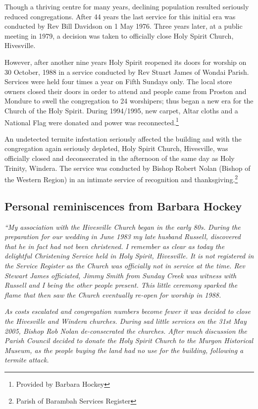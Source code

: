 Though a thriving centre for many years, declining population resulted seriously reduced congregations. After 44 years the last service for this initial era was conducted by Rev Bill Davidson on 1 May 1976. Three years later, at a public meeting in 1979, a decision was taken to officially close Holy Spirit Church, Hivesville.

However, after another nine years Holy Spirit reopened its doors for worship on 30 October, 1988 in a service conducted by Rev Stuart James of Wondai Parish. Services were held four times a year on Fifth Sundays only. The local store owners closed their doors in order to attend and people came from Proston and Mondure to swell the congregation to 24 worshipers; thus began a new era for the Church of the Holy Spirit. During 1994/1995, new carpet, Altar cloths and a National Flag were donated and power was reconnected.\footnote{Provided by Barbara Hockey}

An undetected termite infestation seriously affected the building and with the congregation again seriously depleted, Holy Spirit Church, Hivesville, was officially closed and deconsecrated in the afternoon of the same day as Holy Trinity, Windera. The service was conducted by Bishop Robert Nolan (Bishop of the Western Region) in an intimate service of recognition and thanksgiving.\footnote{Parish of Barambah Services Register}

\hypertarget{personal-reminiscences-from-barbara-hockey}{%
\subsection{Personal reminiscences from Barbara Hockey}\label{personal-reminiscences-from-barbara-hockey}}

\emph{``My association with the Hivesville Church began in the early 80s. During the preparation for our wedding in June 1983 my late husband Russell, discovered that he in fact had not been christened. I remember as clear as today the delightful Christening Service held in Holy Spirit, Hivesville. It is not registered in the Service Register as the Church was officially not in service at the time. Rev Stewart James officiated, Jimmy Smith from Sunday Creek was witness with Russell and I being the other people present. This little ceremony sparked the flame that then saw the Church eventually re-open for worship in 1988.}

\emph{As costs escalated and congregation numbers become fewer it was decided to close the Hivesville and Windera churches. During sad little services on the 31st May 2005, Bishop Rob Nolan de-consecrated the churches. After much discussion the Parish Council decided to donate the Holy Spirit Church to the Murgon Historical Museum, as the people buying the land had no use for the building, following a termite attack.}

